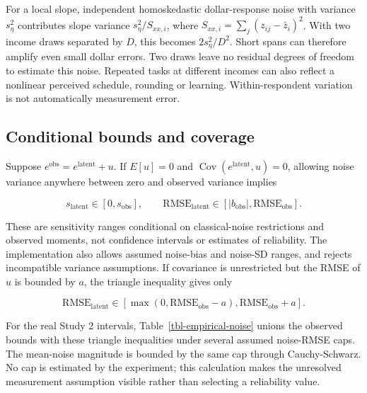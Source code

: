 \documentclass[
  11pt,
  letterpaper,
  DIV=11,
  numbers=noendperiod]{scrartcl}
\begin{document}
For a local slope, independent homoskedastic dollar-response noise with
variance \(s_\eta^2\) contributes slope variance \(s_\eta^2/S_{xx,i}\),
where \(S_{xx,i}=\sum_j(z_{ij}-\bar z_i)^2\). With two income draws
separated by \(D\), this becomes \(2s_\eta^2/D^2\). Short spans can
therefore amplify even small dollar errors. Two draws leave no residual
degrees of freedom to estimate this noise. Repeated tasks at different
incomes can also reflect a nonlinear perceived schedule, rounding or
learning. Within-respondent variation is not automatically measurement
error.

\subsection{Conditional bounds and
coverage}\label{conditional-bounds-and-coverage}

Suppose \(e^{\mathrm{obs}}=e^{\mathrm{latent}}+u\). If \(E[u]=0\) and
\(\operatorname{Cov}(e^{\mathrm{latent}},u)=0\), allowing noise variance
anywhere between zero and observed variance implies

\[s_{\mathrm{latent}}\in[0,s_{\mathrm{obs}}],\qquad
\mathrm{RMSE}_{\mathrm{latent}}\in[|b_{\mathrm{obs}}|,
\mathrm{RMSE}_{\mathrm{obs}}].\]

These are sensitivity ranges conditional on classical-noise restrictions
and observed moments, not confidence intervals or estimates of
reliability. The implementation also allows assumed noise-bias and
noise-SD ranges, and rejects incompatible variance assumptions. If
covariance is unrestricted but the RMSE of \(u\) is bounded by \(a\),
the triangle inequality gives only

\[\mathrm{RMSE}_{\mathrm{latent}}\in
[\max(0,\mathrm{RMSE}_{\mathrm{obs}}-a),\mathrm{RMSE}_{\mathrm{obs}}+a].\]

For the real Study 2 intervals, Table~\ref{tbl-empirical-noise} unions
the observed bounds with these triangle inequalities under several
assumed noise-RMSE caps. The mean-noise magnitude is bounded by the same
cap through Cauchy-Schwarz. No cap is estimated by the experiment; this
calculation makes the unresolved measurement assumption visible rather
than selecting a reliability value.
\end{document}
